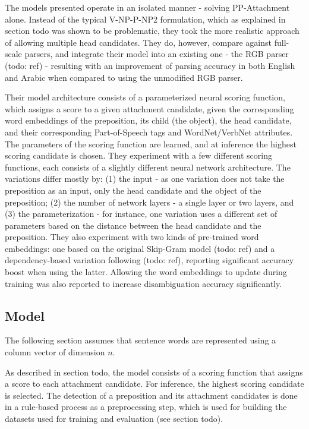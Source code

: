 The models presented operate in an isolated manner - solving PP-Attachment alone. Instead of the typical V-NP-P-NP2 formulation, which as explained in section todo was shown to be problematic, they took the more realistic approach of allowing multiple head candidates. They do, however, compare against full-scale parsers, and integrate their model into an existing one - the RGB parser (todo: ref) - resulting with an improvement of parsing accuracy in both English and Arabic when compared to using the unmodified RGB parser.

Their model architecture consists of a parameterized neural scoring function, which assigns a score to a given attachment candidate, given the corresponding word embeddings of the preposition, its child (the object), the head candidate, and their corresponding Part-of-Speech tags and WordNet/VerbNet attributes. The parameters of the scoring function are learned, and at inference the highest scoring candidate is chosen. They experiment with a few different scoring functions, each consists of a slightly different neural network architecture. The variations differ mostly by: (1)  the input - as one variation does not take the preposition as an input, only the head candidate and the object of the preposition; (2) the number of network layers - a single layer or two layers, and (3) the parameterization - for instance, one variation uses a different set of parameters based on the distance between the head candidate and the preposition. They also experiment with two kinds of pre-trained word embeddings: one based on the original Skip-Gram model (todo: ref) and a dependency-based variation following (todo: ref), reporting significant accuracy boost when using the latter. Allowing the word embeddings to update during training was also reported to increase disambiguation accuracy significantly. 

\subsection{Model}
The following section assumes that sentence words are represented using a column vector of dimension $n$. 

As described in section todo, the model consists of a scoring function that assigns a score to each attachment candidate. For inference, the highest scoring candidate is selected. The detection of a preposition and its attachment candidates is done in a rule-based process as a preprocessing step, which is used for building the datasets used for training and evaluation (see section todo).

